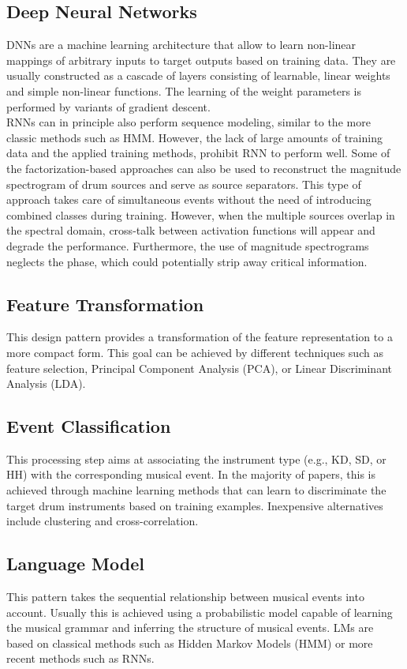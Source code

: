 \subsection*{Deep Neural Networks}
DNNs are a machine learning architecture that allow to learn non-linear mappings of arbitrary inputs to target outputs based on training data. They are usually constructed as a cascade of layers consisting of learnable, linear weights and simple non-linear functions. The learning of the weight parameters is performed by variants of gradient descent. \\ 
RNNs can in principle also perform sequence modeling, similar to the more classic methods such as HMM. However, the lack of large amounts of training data and the applied training methods, prohibit RNN to perform well. Some of the factorization-based approaches can also be used to reconstruct the magnitude spectrogram of drum sources and serve as source separators. This type of approach takes care of simultaneous events without the need of introducing combined classes during training. However, when the multiple sources overlap in the spectral domain, cross-talk between activation functions will appear and degrade the performance. Furthermore, the use of
magnitude spectrograms neglects the phase, which could potentially strip away critical information. 


\subsection*{Feature Transformation}
This design pattern provides a transformation of the feature representation to a more compact form. This goal can be achieved by different techniques such as feature selection, Principal Component Analysis (PCA), or Linear Discriminant Analysis (LDA).

\subsection*{Event Classification}
This processing step aims at associating the instrument type (e.g., KD, SD, or HH) with the corresponding musical event. In the majority of papers, this is achieved through machine learning methods that can learn to discriminate the target drum instruments based on training examples. Inexpensive alternatives include clustering and cross-correlation.


\subsection*{Language Model}
This pattern takes the sequential relationship between musical events into account. Usually this is achieved using a probabilistic model capable of learning the musical grammar and inferring the structure of musical events. LMs are based on classical methods such as Hidden Markov Models (HMM) or more recent methods such as RNNs.
